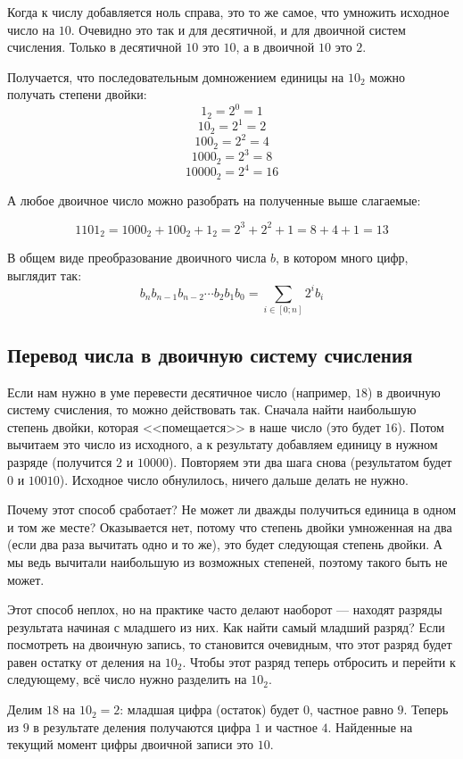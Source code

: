 Когда к числу добавляется ноль справа, это то же самое, что умножить исходное число на $10$.
Очевидно это так и для десятичной, и для двоичной систем счисления. Только в десятичной
$10$ это $10$, а в двоичной $10$ это $2$.

Получается, что последовательным домножением единицы на $10_2$ можно получать степени двойки:
$$1_2=2^0=1$$
$$10_2=2^1=2$$
$$100_2=2^2=4$$
$$1000_2=2^3=8$$
$$10000_2=2^4=16$$

А любое двоичное число можно разобрать на полученные выше слагаемые:

$$1101_2=1000_2+100_2+1_2=2^3+2^2+1=8+4+1=13$$

В общем виде преобразование двоичного числа $b$, в котором много цифр, выглядит так:
$$b_nb_{n-1}b_{n-2}\cdots b_2b_1b_0 = \sum_{i\in[0;n]}2^ib_i$$

\subsection{Перевод числа в двоичную систему счисления}

Если нам нужно в уме перевести десятичное число (например, $18$) в двоичную систему счисления,
то можно действовать так.
Сначала найти наибольшую степень двойки, которая <<помещается>> в наше число (это будет $16$).
Потом вычитаем это число из исходного, а к результату добавляем единицу в нужном разряде
(получится $2$ и $10000$).
Повторяем эти два шага снова (результатом будет $0$ и $10010$). Исходное число обнулилось,
ничего дальше делать не нужно.

Почему этот способ сработает? Не может ли дважды получиться единица в одном и том же месте?
Оказывается нет, потому что степень двойки умноженная на два (если два раза вычитать одно и то же),
это будет следующая степень двойки. А мы ведь вычитали наибольшую из возможных степеней, поэтому
такого быть не может.

Этот способ неплох, но на практике часто делают наоборот --- находят разряды результата начиная
с младшего из них. Как найти самый младший разряд? Если посмотреть на двоичную запись,
то становится очевидным, что этот разряд будет равен остатку от деления на $10_2$.
Чтобы этот разряд теперь отбросить и перейти к следующему, всё число нужно разделить на $10_2$.

Делим $18$ на $10_2=2$: младшая цифра (остаток) будет $0$, частное равно $9$.
Теперь из $9$ в результате деления получаются цифра $1$ и частное $4$.
Найденные на текущий момент цифры двоичной записи это $10$.

